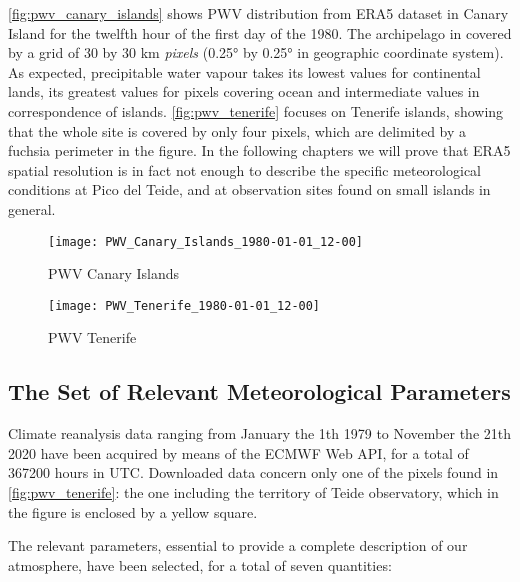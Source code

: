 \autoref{fig:pwv_canary_islands} shows PWV distribution from ERA5 dataset
in Canary Island for the twelfth hour of the first day of the 1980. The
archipelago in covered by a grid of \num{30} by \num{30} \si{\kilo\meter}
\emph{pixels}  (\ang{0.25} by \ang{0.25} in geographic coordinate system).
As expected, precipitable water vapour takes its lowest values for
continental lands, its greatest values for pixels covering ocean and
intermediate values in correspondence of islands. \autoref{fig:pwv_tenerife}
focuses on Tenerife islands, showing that the whole site is covered by only four
pixels, which are delimited by a fuchsia perimeter in the figure.
In the following chapters we will prove that ERA5 spatial
resolution is in fact not enough to describe the specific meteorological
conditions at Pico del Teide, and at observation sites found on
small islands in general.

\begin{figure}
        \centering
        \texttt{[image: PWV\_Canary\_Islands\_1980-01-01\_12-00]}
        \caption{PWV Canary Islands}
        \label{fig:pwv_canary_islands}
\end{figure}

\begin{figure}
        \centering
        \texttt{[image: PWV\_Tenerife\_1980-01-01\_12-00]}
        \caption{PWV Tenerife}
        \label{fig:pwv_tenerife}
\end{figure}

\subsection{The Set of Relevant Meteorological Parameters}

Climate reanalysis data ranging from January the 1th 1979 to November
the 21th 2020 have been acquired by means of the ECMWF Web API, for a total of
\num{367200} hours in UTC. Downloaded data concern only one of the pixels found in
\autoref{fig:pwv_tenerife}: the one including the territory of Teide
observatory, which in the figure is enclosed by a yellow
square.

The relevant parameters, essential to provide a complete description of our
atmosphere, have been selected, for a total of seven quantities:

